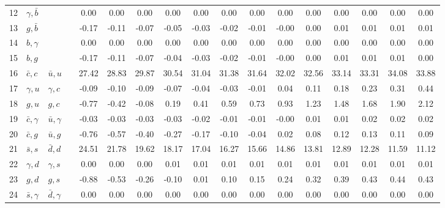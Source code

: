 \begin{tabularx}{\textwidth}{rXXX@{}S@{}S@{}S@{}S@{}S@{}S@{}S@{}S@{}S@{}S@{}S@{}S@{}S}
 12 & $\gamma,\bar b$  &                  &                 &  0.00 &  0.00 &  0.00 &  0.00 &  0.00 &  0.00 &  0.00 &  0.00 &  0.00 &  0.00 &  0.00 &  0.00 &  0.00 \\
 13 & $g,\bar b$       &                  &                 & -0.17 & -0.11 & -0.07 & -0.05 & -0.03 & -0.02 & -0.01 & -0.00 &  0.00 &  0.01 &  0.01 &  0.01 &  0.01 \\
 14 & $b,\gamma$       &                  &                 &  0.00 &  0.00 &  0.00 &  0.00 &  0.00 &  0.00 &  0.00 &  0.00 &  0.00 &  0.00 &  0.00 &  0.00 &  0.00 \\
 15 & $b,g$            &                  &                 & -0.17 & -0.11 & -0.07 & -0.04 & -0.03 & -0.02 & -0.01 & -0.00 &  0.00 &  0.01 &  0.01 &  0.01 &  0.00 \\
 16 & $\bar c,c$       & $\bar u,u$       &                 & 27.42 & 28.83 & 29.87 & 30.54 & 31.04 & 31.38 & 31.64 & 32.02 & 32.56 & 33.14 & 33.31 & 34.08 & 33.88 \\
 17 & $\gamma, u$      & $\gamma, c$      &                 & -0.09 & -0.10 & -0.09 & -0.07 & -0.04 & -0.03 & -0.01 &  0.04 &  0.11 &  0.18 &  0.23 &  0.31 &  0.44 \\
 18 & $g,u$            & $g,c$            &                 & -0.77 & -0.42 & -0.08 &  0.19 &  0.41 &  0.59 &  0.73 &  0.93 &  1.23 &  1.48 &  1.68 &  1.90 &  2.12 \\
 19 & $\bar c,\gamma$  & $\bar u,\gamma$  &                 & -0.03 & -0.03 & -0.03 & -0.03 & -0.02 & -0.01 & -0.01 & -0.00 &  0.01 &  0.01 &  0.02 &  0.02 &  0.02 \\
 20 & $\bar c, g$      & $\bar u, g$      &                 & -0.76 & -0.57 & -0.40 & -0.27 & -0.17 & -0.10 & -0.04 &  0.02 &  0.08 &  0.12 &  0.13 &  0.11 &  0.09 \\
 21 & $\bar s, s$      & $\bar d, d$      &                 & 24.51 & 21.78 & 19.62 & 18.17 & 17.04 & 16.27 & 15.66 & 14.86 & 13.81 & 12.89 & 12.28 & 11.59 & 11.12 \\
 22 & $\gamma, d$      & $\gamma, s$      &                 &  0.00 &  0.00 &  0.00 &  0.01 &  0.01 &  0.01 &  0.01 &  0.01 &  0.01 &  0.01 &  0.01 &  0.01 &  0.01 \\
 23 & $g,d$            & $g,s$            &                 & -0.88 & -0.53 & -0.26 & -0.10 &  0.01 &  0.10 &  0.15 &  0.24 &  0.32 &  0.39 &  0.43 &  0.44 &  0.43 \\
 24 & $\bar s,\gamma$  & $\bar d,\gamma$  &                 &  0.00 &  0.00 &  0.00 &  0.00 &  0.00 &  0.00 &  0.00 &  0.00 &  0.00 &  0.00 &  0.00 &  0.00 &  0.00 \\

\end{tabularx}
